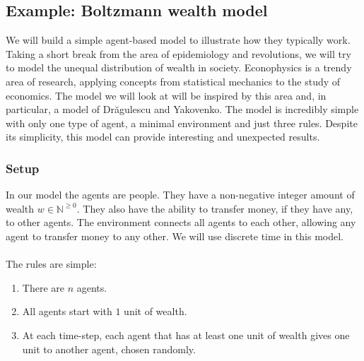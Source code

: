 \subsection{Example: Boltzmann wealth model}\label{sec:boltzmann-wealth}
We will build a simple agent-based model to illustrate how they typically work. Taking a short break from the area of epidemiology and revolutions, we will try to model the unequal distribution of wealth in society. Econophysics is a trendy area of research, applying concepts from statistical mechanics to the study of economics\cite{econophysics2}. The model we will look at will be inspired by this area and, in particular, a model of Dr\u agulescu\cite{econophysics1} and Yakovenko\cite{boltzmann-tutorial}. The model is incredibly simple with only one type of agent, a minimal environment and just three rules. Despite its simplicity, this model can provide interesting and unexpected results.
\subsubsection{Setup}
In our model the agents are people. They have a non-negative integer amount of wealth $w\in\mathbb{N}^{\geq 0}$. They also have the ability to transfer money, if they have any, to other agents. The environment connects all agents to each other, allowing any agent to transfer money to any other. We will use discrete time in this model.\\
\\
The rules are simple:
\begin{enumerate}[
	]
	\item\label{} There are $n$ agents.
	\item\label{} All agents start with $1$ unit of wealth.
	\item\label{} At each time-step, each agent that has at least one unit of wealth gives one unit to another agent, chosen randomly.
	\setcounter{rule}{\value{enumi}}
\end{enumerate}
